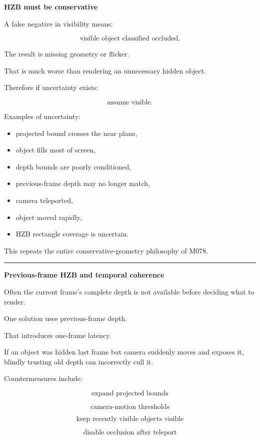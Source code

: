 \textbf{HZB must be conservative}

A false negative in visibility means:

\[
\text{visible object classified occluded}.
\]

The result is missing geometry or flicker.

That is much worse than rendering an unnecessary hidden object.

Therefore if uncertainty exists:

\[
\boxed{\text{assume visible}.}
\]

Examples of uncertainty:

\begin{itemize}
\tightlist
\item
  projected bound crosses the near plane,
\item
  object fills most of screen,
\item
  depth bounds are poorly conditioned,
\item
  previous-frame depth may no longer match,
\item
  camera teleported,
\item
  object moved rapidly,
\item
  HZB rectangle coverage is uncertain.
\end{itemize}

This repeats the entire conservative-geometry philosophy of M078.

\begin{center}\rule{0.5\linewidth}{0.5pt}\end{center}

\textbf{Previous-frame HZB and temporal coherence}

Often the current frame's complete depth is not available before deciding what to render.

One solution uses previous-frame depth.

That introduces one-frame latency.

If an object was hidden last frame but camera suddenly moves and exposes it, blindly trusting old depth can incorrectly cull it.

Countermeasures include:

\[
\text{expand projected bounds}
\]

\[
\text{camera-motion thresholds}
\]

\[
\text{keep recently visible objects visible}
\]

\[
\text{disable occlusion after teleport}
\]

